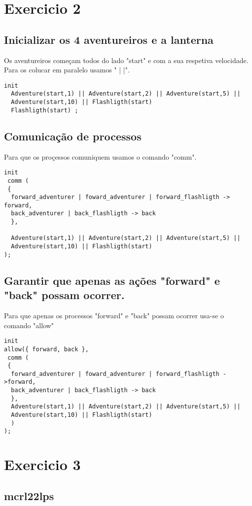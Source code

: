 \documentclass[11pt, oneside]{article}   	%
\begin{document}
\section{Exercicio 2}
\subsection{Inicializar os 4 aventureiros e a lanterna}
Os aventureiros come\c{c}am todos do lado "start" e com a sua respetiva velocidade.  Para os colucar em paralelo usamos " | |".

\begin{lstlisting}
init
  Adventure(start,1) || Adventure(start,2) || Adventure(start,5) || 
  Adventure(start,10) || Flashligth(start) 
  Flashligth(start) ;
\end{lstlisting}
\subsection{Comunica\c{c}\~ao de processos}
Para que os pro\c{c}essos comuniquem usamos o comando "comm".
\begin{lstlisting}
init
 comm (
 {
  forward_adventurer | foward_adventurer | forward_flashligth -> forward, 
  back_adventurer | back_flashligth -> back	 
  },
  
  Adventure(start,1) || Adventure(start,2) || Adventure(start,5) || 
  Adventure(start,10) || Flashligth(start) 
);
\end{lstlisting}

\subsection{Garantir que apenas as a\c{c}\~oes "forward" e "back" possam ocorrer. }
Para que apenas os processos "forward" e "back" possam ocorrer usa-se o comando "allow"
\begin{lstlisting}
init
allow({ forward, back },
 comm (
 {
  forward_adventurer | foward_adventurer | forward_flashligth ->forward, 
  back_adventurer | back_flashligth -> back	 
  },
  Adventure(start,1) || Adventure(start,2) || Adventure(start,5) || 
  Adventure(start,10) || Flashligth(start) 
  )
);
\end{lstlisting}

\section{Exercicio 3}
\subsection{mcrl22lps }
\end{document}
